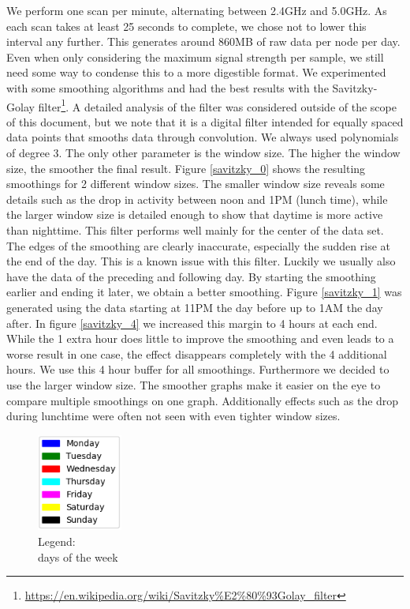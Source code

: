 \documentclass[a4paper, 11pt]{article}
\begin{document}
We perform one scan per minute, alternating between 2.4GHz and 5.0GHz. As each scan takes at least 25 seconds to complete, we chose not to lower this interval any further. This generates around 860MB of raw data per node per day. Even when only considering the maximum signal strength per sample, we still need some way to condense this to a more digestible format. We experimented with some smoothing algorithms and had the best results with the Savitzky-Golay filter\footnote{\url{https://en.wikipedia.org/wiki/Savitzky\%E2\%80\%93Golay_filter}}. A detailed analysis of the filter was considered outside of the scope of this document, but we note that it is a digital filter intended for equally spaced data points that smooths data through convolution. We always used polynomials of degree 3. The only other parameter is the window size. The higher the window size, the smoother the final result. Figure \ref{savitzky_0} shows the resulting smoothings for 2 different window sizes. The smaller window size reveals some details such as the drop in activity between noon and 1PM (lunch time), while the larger window size is detailed enough to show that daytime is more active than nighttime. This filter performs well mainly for the center of the data set. The edges of the smoothing are clearly inaccurate, especially the sudden rise at the end of the day. This is a known issue with this filter. Luckily we usually also have the data of the preceding and following day. By starting the smoothing earlier and ending it later, we obtain a better smoothing. Figure \ref{savitzky_1} was generated using the data starting at 11PM the day before up to 1AM the day after. In figure \ref{savitzky_4} we increased this margin to 4 hours at each end. While the 1 extra hour does little to improve the smoothing and even leads to a worse result in one case, the effect disappears completely with the 4 additional hours. We use this 4 hour buffer for all smoothings. Furthermore we decided to use the larger window size. The smoother graphs make it easier on the eye to compare multiple smoothings on one graph. Additionally effects such as the drop during lunchtime were often not seen with even tighter window sizes.\\
\newpage
\begin{figure}
\centering
\captionsetup{justification=centering}
\includegraphics[width=0.25\textwidth]{legend.png}
\caption{Legend:\\ days of the week}
\label{legend}
\end{figure}
\end{document}
